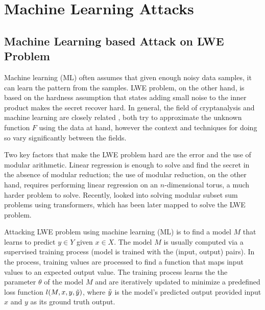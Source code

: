 
\chapter{Machine Learning Attacks}
\setcounter{section}{0}

\section{Machine Learning based Attack on LWE Problem}
Machine learning (ML) often assumes that given enough noisy data samples, it can learn the pattern from the samples. LWE problem, on the other hand, is based on the hardness assumption that states adding small noise to the inner product makes the secret recover hard. In general, the field of cryptanalysis and machine learning are closely related \cite{rivest1991cryptography}, both try to approximate the unknown function $F$ using the data at hand, however the context and techniques for doing so vary significantly between the fields.


Two key factors that make the LWE problem hard are the error and the use of modular arithmetic. Linear regression is enough to solve and find the secret in the absence of modular reduction; the use of modular reduction, on the other hand, requires performing linear regression on an $n$-dimensional torus, a much harder problem to solve. Recently, \cite{wenger2022salsa,li2023salsapic,li2023salsaver} looked into solving modular subset sum problems using transformers, which has been later mapped to solve the LWE problem.

Attacking LWE problem using machine learning (ML) is to find a model $M$ that learns to predict $y \in Y$ given $x \in X$. The model $M$ is usually computed via a supervised training process (model is trained with the (input, output) pairs). In the process, training values are processed to find a function that maps input values to an expected output value. The training process learns the the parameter $\theta$ of the model $M$ and are iteratively updated to minimize a predefined loss function $l(M,x,y,\Tilde{y})$, where $\Tilde{y}$ is the model's predicted output provided input $x$ and $y$ as its ground truth output.

